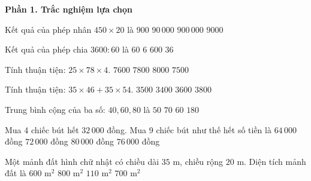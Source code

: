 \textbf{Phần 1. Trắc nghiệm lựa chọn}

\begin{ex} %
Kết quả của phép nhân $450 \times 20$ là
\choice
{$900$}
{$90\,000$}
{$900\,000$}
{\True $9000$}
\end{ex}

\begin{ex} %
Kết quả của phép chia $3600 : 60$ là
\choice
{\True $60$}
{$6$}
{$600$}
{$36$}
\end{ex}

\begin{ex} %
Tính thuận tiện: $25 \times 78 \times 4$.
\choice
{$7600$}
{\True $7800$}
{$8000$}
{$7500$}
\end{ex}

\begin{ex} %
Tính thuận tiện: $35 \times 46 + 35 \times 54$.
\choice
{\True $3500$}
{$3400$}
{$3600$}
{$3800$}
\end{ex}

\begin{ex} %
Trung bình cộng của ba số: $40, 60, 80$ là
\choice
{$50$}
{$70$}
{\True $60$}
{$180$}
\end{ex}

\begin{ex} %
Mua 4 chiếc bút hết $32\,000$ đồng. Mua 9 chiếc bút như thế hết số tiền là
\choice
{$64\,000$ đồng}
{\True $72\,000$ đồng}
{$80\,000$ đồng}
{$76\,000$ đồng}
\end{ex}

\begin{ex} %
Một mảnh đất hình chữ nhật có chiều dài $35\text{ m}$, chiều rộng $20\text{ m}$. Diện tích mảnh đất là
\choice
{$600\text{ m}^2$}
{$800\text{ m}^2$}
{$110\text{ m}^2$}
{\True $700\text{ m}^2$}
\end{ex}

